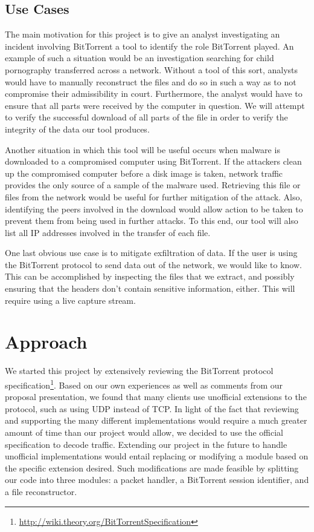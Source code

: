 \documentclass{acm_proc_article-sp}
\begin{document}
\subsection{Use Cases}
The main motivation for this project is to give an analyst investigating an
incident involving BitTorrent a tool to identify the role BitTorrent played.  An
example of such a situation would be an investigation searching for child
pornography transferred across a network. Without a tool of this sort, analysts
would have to manually reconstruct the files and do so in such a way as to not
compromise their admissibility in court. Furthermore, the analyst would have to
ensure that all parts were received by the computer in question. We will attempt
to verify the successful download of all parts of the file in order to verify
the integrity of the data our tool produces.

Another situation in which this tool will be useful occurs when malware is
downloaded to a compromised computer using BitTorrent. If the attackers clean up
the compromised computer before a disk image is taken, network traffic
provides the only source of a sample of the malware used. Retrieving this file
or files from the network would be useful for further mitigation of the
attack. Also, identifying the peers involved in the download would allow action
to be taken to prevent them from being used in further attacks. To this end, our
tool will also list all IP addresses involved in the transfer of each file.

One last obvious use case is to mitigate exfiltration of data.  If the user is
using the BitTorrent protocol to send data out of the network, we would like to
know.  This can be accomplished by inspecting the files that we extract, and
possibly ensuring that the headers don't contain sensitive information, either.
This will require using a live capture stream.



\section{Approach}
We started this project by extensively reviewing the BitTorrent protocol
specification\footnote{\url{http://wiki.theory.org/BitTorrentSpecification}}.
Based on our own experiences as well as comments from our proposal presentation,
we found that many clients use unofficial extensions to the protocol, such as
using UDP instead of TCP. In light of the fact that reviewing and supporting
the many different implementations would require a much greater amount of time
than our project would allow, we decided to use the official specification to
decode traffic. Extending our project in the future to handle unofficial
implementations would entail replacing or modifying a module based on the
specific extension desired. Such modifications are made feasible by splitting
our code into three modules: a packet handler, a BitTorrent session identifier,
and a file reconstructor.
\end{document}
